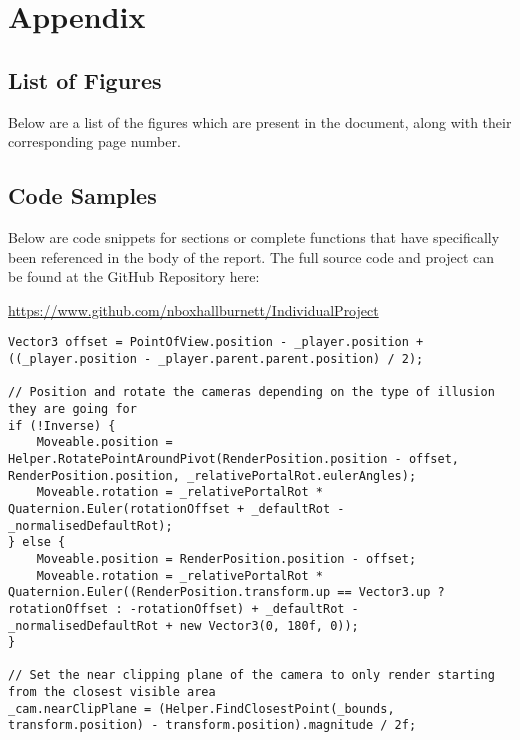 \chapter{Appendix}
\label{appendix}

	\begingroup
		\section{List of Figures}
		\label{appendix:figures}

		Below are a list of the figures which are present in the document, along with their corresponding page number.

		\renewcommand{\chapter}[2]{}		%
		\listoffigures						%
	\endgroup

	\section{Code Samples}
	\label{appendix:code}

		Below are code snippets for sections or complete functions that have specifically been referenced in the body of the report.
		The full source code and project can be found at the GitHub Repository here:

		\url{https://www.github.com/nboxhallburnett/IndividualProject}

		\begin{lstlisting}[caption="Camera Positioning - CameraRenderPosition.cs", label=appendix:code:camera, firstnumber=85]
Vector3 offset = PointOfView.position - _player.position + ((_player.position - _player.parent.parent.position) / 2);

// Position and rotate the cameras depending on the type of illusion they are going for
if (!Inverse) {
	Moveable.position = Helper.RotatePointAroundPivot(RenderPosition.position - offset, RenderPosition.position, _relativePortalRot.eulerAngles);
	Moveable.rotation = _relativePortalRot * Quaternion.Euler(rotationOffset + _defaultRot - _normalisedDefaultRot);
} else {
	Moveable.position = RenderPosition.position - offset;
	Moveable.rotation = _relativePortalRot * Quaternion.Euler((RenderPosition.transform.up == Vector3.up ? rotationOffset : -rotationOffset) + _defaultRot - _normalisedDefaultRot + new Vector3(0, 180f, 0));
}

// Set the near clipping plane of the camera to only render starting from the closest visible area
_cam.nearClipPlane = (Helper.FindClosestPoint(_bounds, transform.position) - transform.position).magnitude / 2f;
		\end{lstlisting}

